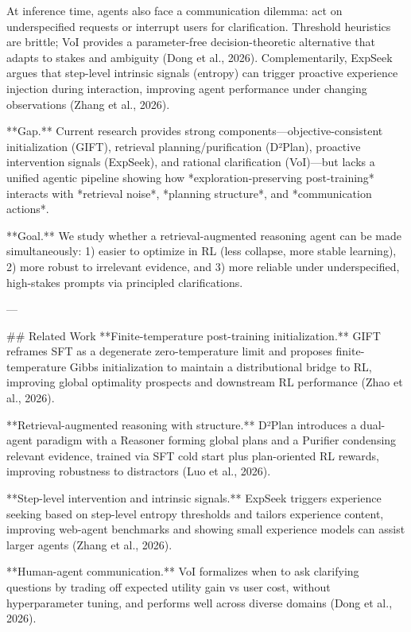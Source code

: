 At inference time, agents also face a communication dilemma: act on underspecified requests or interrupt users for clarification. Threshold heuristics are brittle; VoI provides a parameter-free decision-theoretic alternative that adapts to stakes and ambiguity (Dong et al., 2026). Complementarily, ExpSeek argues that step-level intrinsic signals (entropy) can trigger proactive experience injection during interaction, improving agent performance under changing observations (Zhang et al., 2026).  

**Gap.** Current research provides strong components—objective-consistent initialization (GIFT), retrieval planning/purification (D²Plan), proactive intervention signals (ExpSeek), and rational clarification (VoI)—but lacks a unified agentic pipeline showing how *exploration-preserving post-training* interacts with *retrieval noise*, *planning structure*, and *communication actions*.  

**Goal.** We study whether a retrieval-augmented reasoning agent can be made simultaneously:  
1) easier to optimize in RL (less collapse, more stable learning),  
2) more robust to irrelevant evidence, and  
3) more reliable under underspecified, high-stakes prompts via principled clarifications.  

---

## Related Work  
**Finite-temperature post-training initialization.** GIFT reframes SFT as a degenerate zero-temperature limit and proposes finite-temperature Gibbs initialization to maintain a distributional bridge to RL, improving global optimality prospects and downstream RL performance (Zhao et al., 2026).  

**Retrieval-augmented reasoning with structure.** D²Plan introduces a dual-agent paradigm with a Reasoner forming global plans and a Purifier condensing relevant evidence, trained via SFT cold start plus plan-oriented RL rewards, improving robustness to distractors (Luo et al., 2026).  

**Step-level intervention and intrinsic signals.** ExpSeek triggers experience seeking based on step-level entropy thresholds and tailors experience content, improving web-agent benchmarks and showing small experience models can assist larger agents (Zhang et al., 2026).  

**Human-agent communication.** VoI formalizes when to ask clarifying questions by trading off expected utility gain vs user cost, without hyperparameter tuning, and performs well across diverse domains (Dong et al., 2026).  

